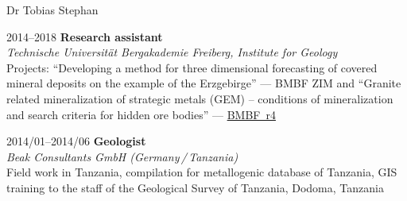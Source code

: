 \documentclass[10pt, paper=letter]{scrartcl} %
\begin{document}
\begin{cv}{\textsf{Dr Tobias Stephan}}
\begin{cvlist}{}
        \item[2014--2018] \textbf{Research assistant}\\
        \textit{Technische Universit\"at Bergakademie Freiberg, Institute for Geology}
        \\ Projects: \enquote{Developing a method for three dimensional forecasting of covered mineral deposits on the example of the Erzgebirge} --- BMBF ZIM and \enquote{Granite related mineralization of strategic metals (GEM) – conditions of mineralization and search criteria for hidden ore bodies} --- \href{https://www.gfz-potsdam.de/en/section/inorganic-and-isotope-geochemistry/projects/prohydrogen-more-mofette-research-prosalz-gramm-sugar-gem-amrep-halmahera-gogaf-irup-spp-sample-ketzin-co2-cosanostra-inkaba-yeafrica-dafgas/gem/bmbf-r4-gem}{BMBF~r4}
        \item[2014/01--2014/06] \textbf{Geologist}\\
        \textit{Beak Consultants GmbH (Germany\,/\,Tanzania)}\\
        Field work in Tanzania, compilation for metallogenic database of Tanzania, GIS training to the staff of the Geological Survey of Tanzania, Dodoma, Tanzania

\end{cvlist}
\end{cv}
\end{document}
